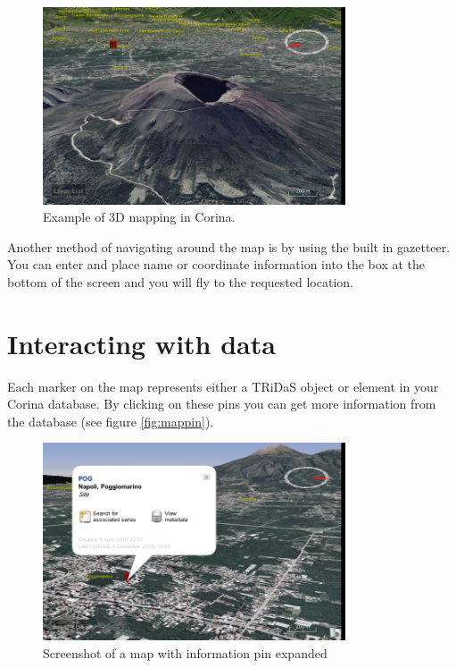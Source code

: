 \begin{figure}[hbtp]
  \caption{Example of 3D mapping in Corina.}
  \label{fig:3dmap}
  \centering
    \includegraphics[width=0.8\textwidth]{Images/3dmapexample.png}
\end{figure}

Another method of navigating around the map is by using the built in gazetteer. You can enter and place name or coordinate information into the box at the bottom of the screen and you will fly to the requested location. 


\section{Interacting with data}

Each marker on the map represents either a TRiDaS object or element in your Corina database. By clicking on these pins you can get more information from the database (see figure \ref{fig:mappin}).

\begin{figure}[hbtp]
  \caption{Screenshot of a map with information pin expanded}
  \label{fig:3dmap}
  \centering
    \includegraphics[width=0.8\textwidth]{Images/mappinexample.png}
\end{figure}

